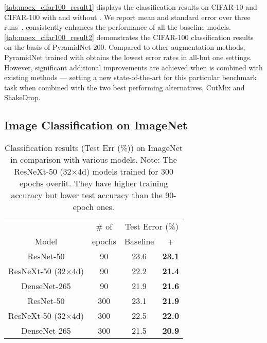 \documentclass[final]{cvpr}
\begin{document}
\autoref{tab:moex_cifar100_result1} displays the classification results on CIFAR-10 and CIFAR-100 with and without \methodname{}. We report mean and standard error over three runs~\cite{gurland1971simple}. \methodname{} consistently enhances the performance of all the baseline models. 
\autoref{tab:moex_cifar100_result2} demonstrates the CIFAR-100 classification results on the basis of PyramidNet-200. 
Compared to other augmentation methods, PyramidNet trained with \methodname{} obtains the lowest error rates in all-but one settings. However, significant additional improvements are achieved when \methodname{}  is combined with existing methods  --- setting a new  state-of-the-art for this particular benchmark task when combined with the two best performing alternatives, CutMix and ShakeDrop.






\subsection{Image Classification on ImageNet}

\begin{table}[t]
    \centering
    \begin{tabular}{c|c|c|c}
\toprule
& \multicolumn{1}{c}{\# of} & \multicolumn{2}{|c}{Test  Error (\%)} \\
\cline{3-4}
Model & epochs & Baseline &+\methodname{}  \\  
\midrule\midrule
ResNet-50   & 90 &23.6 &\textbf{23.1}  \\
ResNeXt-50 (32$\times$4d)& 90 & 22.2 &\textbf{21.4}   \\
DenseNet-265 &90&21.9 & \textbf{21.6}    \\
\midrule
ResNet-50 &  300& 23.1&\textbf{21.9} \\
ResNeXt-50 (32$\times$4d) &300 & 22.5 &\textbf{22.0}  \\
DenseNet-265 &300& 21.5&\textbf{20.9}  \\
\bottomrule
\end{tabular}
\caption{Classification results (Test Err (\%)) on ImageNet in comparison with various models.
Note: The ResNeXt-50 (32$\times$4d) models trained for 300 epochs overfit. They have higher training accuracy but lower test accuracy than the 90-epoch ones.}
\label{tab:moex_imagenet_baseline_result} \end{table}
\end{document}
